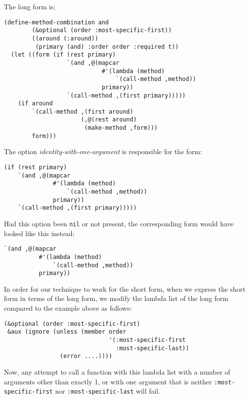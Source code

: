 \noindent
The long form is;

{\small\begin{verbatim}
(define-method-combination and
        (&optional (order :most-specific-first))
        ((around (:around))
         (primary (and) :order order :required t))
  (let ((form (if (rest primary)
                  `(and ,@(mapcar
                            #'(lambda (method)
                                `(call-method ,method))
                            primary))
                  `(call-method ,(first primary)))))
    (if around
        `(call-method ,(first around)
                      (,@(rest around)
                       (make-method ,form)))
        form)))
\end{verbatim}}

\noindent
The option \textit{identity-with-one-argument} is responsible for the
form:

{\small\begin{verbatim}
(if (rest primary)
    `(and ,@(mapcar
              #'(lambda (method)
                  `(call-method ,method))
              primary))
    `(call-method ,(first primary)))))
\end{verbatim}}

\noindent
Had this option been \texttt{nil} or not present, the corresponding
form would have looked like this instead:

{\small\begin{verbatim}
`(and ,@(mapcar
          #'(lambda (method)
              `(call-method ,method))
          primary))
\end{verbatim}}

\noindent
In order for our technique to work for the short form, when we express
the short form in terms of the long form, we modify the lambda list of
the long form compared to the example above as follows:

{\small\begin{verbatim}
(&optional (order :most-specific-first)
 &aux (ignore (unless (member order
                              '(:most-specific-first
                                :most-specific-last))
                (error ....))))
\end{verbatim}}

\noindent
Now, any attempt to call a function with this lambda list with
a number of arguments other than exactly 1, or with one argument that
is neither \texttt{:most-specific-first} nor
\texttt{:most-specific-last} will fail.
